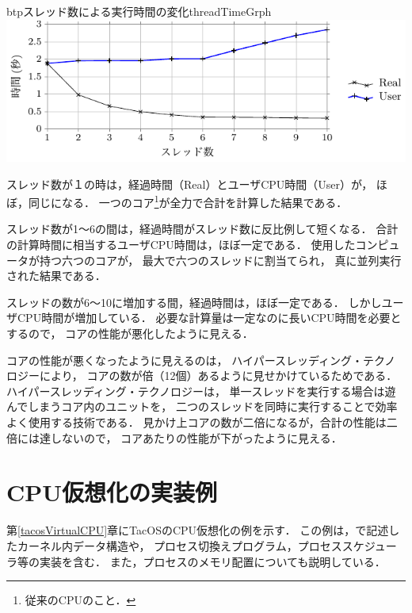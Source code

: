 \begin{myfig}{btp}{スレッド数による実行時間の変化}{threadTimeGrph}
  \includegraphics[scale=1.0]{Tbl/threadTimeGrph.pdf}
\end{myfig}

スレッド数が１の時は，経過時間（Real）とユーザCPU時間（User）が，
ほぼ，同じになる．
一つのコア\footnote{従来のCPUのこと．}が全力で合計を計算した結果である．

スレッド数が1〜6の間は，経過時間がスレッド数に反比例して短くなる．
合計の計算時間に相当するユーザCPU時間は，ほぼ一定である．
使用したコンピュータが持つ六つのコアが，
最大で六つのスレッドに割当てられ，
真に並列実行された結果である．

スレッドの数が6〜10に増加する間，経過時間は，ほぼ一定である．
しかしユーザCPU時間が増加している．
必要な計算量は一定なのに長いCPU時間を必要とするので，
コアの性能が悪化したように見える．

コアの性能が悪くなったように見えるのは，
ハイパースレッディング・テクノロジー\cite{hyperThreading}により，
コアの数が倍（12個）あるように見せかけているためである．
ハイパースレッディング・テクノロジーは，
単一スレッドを実行する場合は遊んでしまうコア内のユニットを，
二つのスレッドを同時に実行することで効率よく使用する技術である．
見かけ上コアの数が二倍になるが，合計の性能は二倍には達しないので，
コアあたりの性能が下がったように見える．


\section{CPU仮想化の実装例}
第\ref{tacosVirtualCPU}章にTacOSのCPU仮想化の例を示す．
この例は，{\cmml}で記述したカーネル内データ構造や，
プロセス切換えプログラム，プロセススケジューラ等の実装を含む．
また，プロセスのメモリ配置についても説明している．

